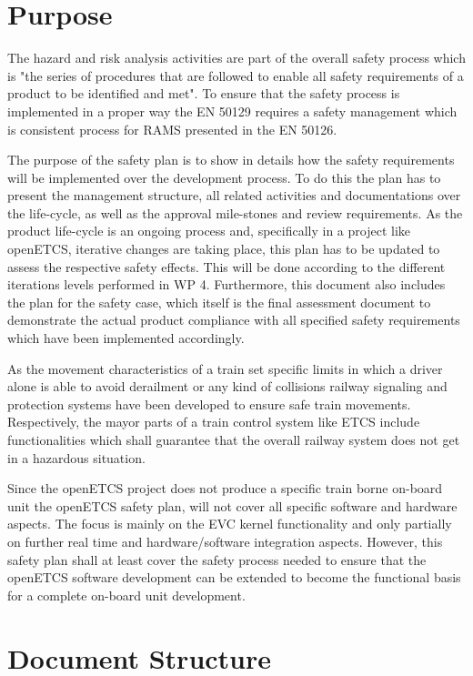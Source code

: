 \documentclass{template/openetcs_report}
\begin{document}
\section{Purpose}
\label{sec:purpose}

The hazard and risk analysis activities are part of the overall safety process which is "the series of procedures that are followed to enable all safety requirements of a product to be identified and met". To ensure that the safety process is implemented in a proper way the EN 50129 requires a safety management which is consistent process for RAMS presented in the EN 50126. 

The purpose of the safety plan is to show in details how the safety requirements will be implemented over the development process. To do this the plan has to present the management structure, all related activities and documentations over the life-cycle, as well as the approval mile-stones and review requirements. As the product life-cycle is an ongoing process and, specifically in a project like openETCS, iterative changes are taking place, this plan has to be updated to assess the respective safety effects. This will be done according to the different iterations levels performed in WP 4. 
Furthermore, this document also includes the plan for the safety case, which itself is the final assessment document to demonstrate the actual product compliance with all specified safety requirements which have been implemented accordingly.

As the movement characteristics of a train set specific limits in which a driver alone is able to avoid derailment or any kind of collisions railway signaling and protection systems have been developed to ensure safe train movements. Respectively, the mayor parts of a train control system like ETCS include functionalities which shall guarantee that the overall railway system does not get in a hazardous situation.

Since the openETCS project does not produce a specific train borne on-board unit the openETCS safety plan, will not cover all specific software and hardware aspects. The focus is mainly on the EVC kernel functionality and only partially on further real time and hardware/software integration aspects. However, this safety plan shall at least cover the safety process needed to ensure that the openETCS software development can be extended to become the functional basis for a complete on-board unit development. 

\section{Document Structure}
\label{sec:document-structure}
\end{document}
